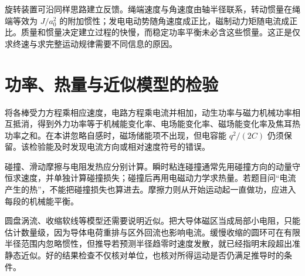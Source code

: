旋转装置可沿同样思路建立反馈。绳端速度与角速度由轴半径联系，转动惯量在绳端等效为 $J/a_0^2$ 的附加惯性；发电电动势随角速度成正比，磁制动力矩随电流成正比。质量和惯量决定建立过程的快慢，而稳定功率平衡未必含这些惯量。这正是仅求终速与求完整运动规律需要不同信息的原因。



\section{功率、热量与近似模型的检验}

将各棒受力方程乘相应速度，电路方程乘电流并相加，动生功率与磁力机械功率相互抵消，得到外力功率等于机械能变化率、电场能变化率、磁场能变化率及焦耳热功率之和。在本讲忽略自感时，磁场储能项不出现，但电容能 $q^2/(2C)$ 仍须保留。该检验能及时发现电流方向或相对速度符号的错误。


碰撞、滑动摩擦与电阻发热应分别计算。瞬时粘连碰撞通常先用碰撞方向的动量守恒求速度，并单独计算碰撞损失；碰撞后再用电磁动力学求热量。若题目问“电流产生的热”，不能把碰撞损失也算进去。摩擦力则从开始运动起一直做功，应进入每段的机械能平衡。


圆盘涡流、收缩软线等模型还需要说明近似。把大导体磁区当成局部小电阻，只能估计数量级，因为导体电荷重排与区外回流也影响电流。缓慢收缩的圆环可在有限半径范围内忽略惯性，但推导若预测半径趋零时速度发散，就已经指明末段超出准静态近似。好的结果检查不仅核对单位，也核对所得运动是否仍满足推导时的条件。


